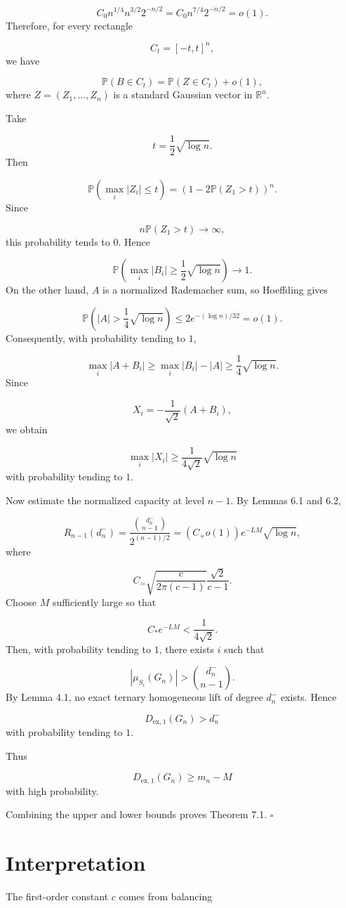\documentclass[11pt]{article}
\theoremstyle{definition}
\begin{document}
\[
C_0 n^{1/4}n^{3/2}2^{-n/2}
=
C_0 n^{7/4}2^{-n/2}
=o(1).
\]
Therefore, for every rectangle

\[
C_t=[-t,t]^n,
\]
we have

\[
\mathbb{P}(B\in C_t)=\mathbb{P}(Z\in C_t)+o(1),
\]
where $Z=(Z_1,\dots,Z_n)$ is a standard Gaussian vector in $\mathbb{R}^n$.

Take

\[
t=\frac12\sqrt{\log n}.
\]
Then

\[
\mathbb{P}\left(\max_i|Z_i|\le t\right)
=
\left(1-2\mathbb{P}(Z_1>t)\right)^n.
\]
Since

\[
n\mathbb{P}(Z_1>t)\to\infty,
\]
this probability tends to $0$. Hence

\[
\mathbb{P}\left(\max_i|B_i|\ge\frac12\sqrt{\log n}\right)\to1.
\]
On the other hand, $A$ is a normalized Rademacher sum, so Hoeffding gives

\[
\mathbb{P}\left(|A|>\frac14\sqrt{\log n}\right)
\le
2e^{-(\log n)/32}
=o(1).
\]
Consequently, with probability tending to $1$,

\[
\max_i|A+B_i|
\ge
\max_i|B_i|-|A|
\ge
\frac14\sqrt{\log n}.
\]
Since

\[
X_i=-\frac1{\sqrt2}(A+B_i),
\]
we obtain

\[
\max_i|X_i|
\ge
\frac1{4\sqrt2}\sqrt{\log n}
\]
with probability tending to $1$.

Now estimate the normalized capacity at level $n-1$. By Lemmas 6.1 and 6.2,

\[
R_{n-1}(d_n^-)
=
\frac{\binom{d_n^-}{n-1}}{2^{(n-1)/2}}
=
(C_+o(1))e^{-LM}\sqrt{\log n},
\]
where

\[
C_=
\sqrt{\frac{c}{2\pi(c-1)}}\frac{\sqrt2}{c-1}.
\]
Choose $M$ sufficiently large so that

\[
C_*e^{-LM}<\frac1{4\sqrt2}.
\]
Then, with probability tending to $1$, there exists $i$ such that

\[
|\mu_{S_i}(G_n)|>\binom{d_n^-}{n-1}.
\]
By Lemma 4.1, no exact ternary homogeneous lift of degree $d_n^-$ exists. Hence

\[
D_{\mathrm{ex},1}(G_n)>d_n^-
\]
with probability tending to $1$.

Thus

\[
D_{\mathrm{ex},1}(G_n)\ge m_n-M
\]
with high probability.

Combining the upper and lower bounds proves Theorem 7.1. $\square$

\section{Interpretation}
The first-order constant $c$ comes from balancing
\end{document}
